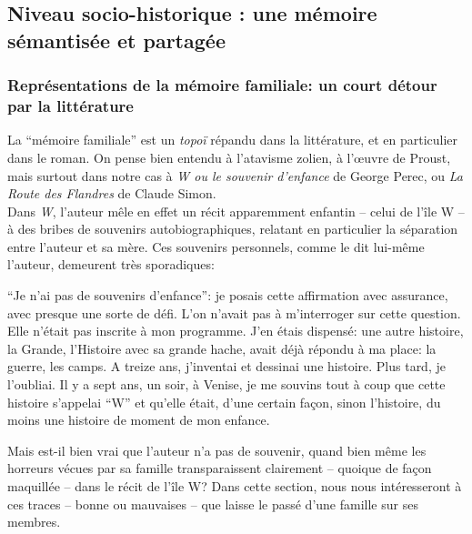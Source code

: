 \documentclass[french]{article}
\begin{document}
		\subsection{Niveau socio-historique : une mémoire sémantisée et partagée}
			\subsubsection{Représentations de la mémoire familiale: un court détour par la littérature}
			La ``mémoire familiale'' est un \textit{topoï} répandu dans la littérature, et en particulier dans le roman. On pense bien entendu à l'atavisme zolien, à l'œuvre de Proust, mais surtout dans notre cas à \textit{W ou le souvenir d'enfance} de George Perec, ou \textit{La Route des Flandres} de Claude Simon.\\
			Dans \textit{W}, l'auteur mêle en effet un récit apparemment enfantin -- celui de l'île W -- à des bribes de souvenirs autobiographiques, relatant en particulier la séparation entre l'auteur et sa mère. Ces souvenirs personnels, comme le dit lui-même l'auteur, demeurent très sporadiques:
			\begin{center}
				\begin{minipage}{.7\textwidth}
				``Je n'ai pas de souvenirs d'enfance'': je posais cette affirmation avec assurance, avec presque une sorte de défi. L'on n'avait pas à m'interroger sur cette question. Elle n'était pas inscrite à mon programme. J'en étais dispensé: une autre histoire, la Grande, l'Histoire avec sa grande hache, avait déjà répondu à ma place: la guerre, les camps. A treize ans, j'inventai et dessinai une histoire. Plus tard, je l'oubliai. Il y a sept ans, un soir, à Venise, je me souvins tout à coup que cette histoire s'appelai ``W'' et qu'elle était, d'une certain façon, sinon l'histoire, du moins une histoire de moment de mon enfance.
			\end{minipage}
			\end{center}
			Mais est-il bien vrai que l'auteur n'a pas de souvenir, quand bien même les horreurs vécues par sa famille transparaissent clairement -- quoique de façon maquillée -- dans le récit de l'île W? Dans cette section, nous nous intéresseront à ces traces -- bonne ou mauvaises -- que laisse le passé d'une famille sur ses membres. \\
			
\end{document}
